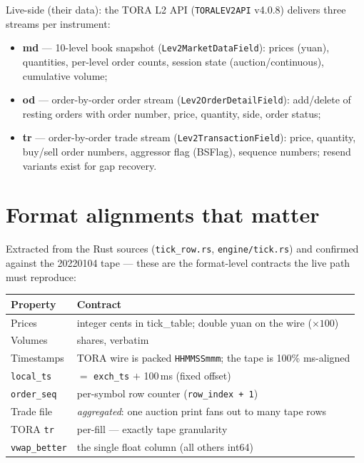\documentclass[11pt,a4paper]{article}
\begin{document}
Live-side (their data): the TORA L2 API (\texttt{TORALEV2API} v4.0.8)
delivers three streams per instrument:
\begin{itemize}
  \item \textbf{md} --- 10-level book snapshot (\texttt{Lev2MarketDataField}):
        prices (yuan), quantities, per-level order counts, session state
        (auction/continuous), cumulative volume;
  \item \textbf{od} --- order-by-order order stream
        (\texttt{Lev2OrderDetailField}): add/delete of resting orders with
        order number, price, quantity, side, order status;
  \item \textbf{tr} --- order-by-order trade stream
        (\texttt{Lev2TransactionField}): price, quantity, buy/sell order
        numbers, aggressor flag (BSFlag), sequence numbers; resend variants
        exist for gap recovery.
\end{itemize}

\section{Format alignments that matter}
\label{sec:formats}

Extracted from the Rust sources (\texttt{tick\_row.rs},
\texttt{engine/tick.rs}) and confirmed against the 20220104 tape --- these
are the format-level contracts the live path must reproduce:

\begin{center}
\begin{tabular}{ll}
\toprule
Property & Contract \\
\midrule
Prices & integer cents in tick\_table; double yuan on the wire ($\times 100$) \\
Volumes & shares, verbatim \\
Timestamps & TORA wire is packed \texttt{HHMMSSmmm}; the tape is 100\% ms-aligned \\
\texttt{local\_ts} & $=$ \texttt{exch\_ts} $+$ 100\,ms (fixed offset) \\
\texttt{order\_seq} & per-symbol row counter (\texttt{row\_index + 1}) \\
Trade file & \emph{aggregated}: one auction print fans out to many tape rows \\
TORA \texttt{tr} & per-fill --- exactly tape granularity \\
\texttt{vwap\_better} & the single float column (all others int64) \\
\bottomrule
\end{tabular}
\end{center}
\end{document}
